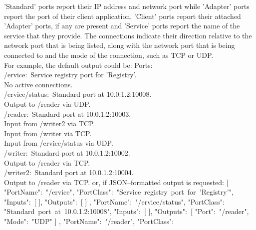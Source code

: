 'Standard' ports report their IP address and network port while 'Adapter' ports report
the \mplusm{} port of their client application, 'Client' ports report their attached
'Adapter' ports, if any are present and 'Service' ports report the name of the \mplusm{}
service that they provide.
The connections indicate their direction relative to the \yarp{} network port that is
being listed, along with the \yarp{} network port that is being connected to and the mode
of the connection, such as TCP or UDP.\\

For example, the default output could be:
\outputBegin{}
Ports:\\
\settowidth{\utilLen}{Por}%
/\textdollar{}ervice:\ Service registry port for 'Registry'.\\
\hspace*{\utilLen}No active connections.\\
/\textdollar{}ervice/status:\ Standard port at 10.0.1.2:10008.\\
\hspace*{\utilLen}Output to /reader via UDP.\\
/reader:\ Standard port at 10.0.1.2:10003.\\
\hspace*{\utilLen}Input from /writer2 via TCP.\\
\hspace*{\utilLen}Input from /writer via TCP.\\
\hspace*{\utilLen}Input from /\textdollar{}ervice/status via UDP.\\
/writer:\ Standard port at 10.0.1.2:10002.\\
\hspace*{\utilLen}Output to /reader via TCP.\\
/writer2:\ Standard port at 10.0.1.2:10004.\\
\hspace*{\utilLen}Output to /reader via TCP.
\outputEnd{}
or, if JSON--formatted output is requested:
\outputBegin{}
[ \textbraceleft{} "PortName":\ "/\textdollar{}ervice",
"PortClass":\ "Service~registry~port~for~'Registry'", "Inputs":\ [  ], "Outputs":\ [  ]
\textbraceright{}, \textbraceleft{} "PortName":\ "/\textdollar{}ervice/status",
"PortClass":\ \\
"Standard~port~at~10.0.1.2:10008", "Inputs":\ [  ], "Outputs":\ [ \textbraceleft{}
"Port":\ "/reader", "Mode":\ "UDP" \textbraceright{} ] \textbraceright{}, \textbraceleft{}
"PortName":\ "/reader", "PortClass":\ \\
